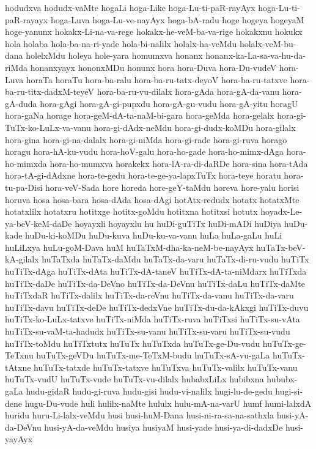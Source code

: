 {hodudxva
hodudx-vaMte
hogaLi
hoga-Like
hoga-Lu-ti-paR-rayAyx
hoga-Lu-ti-paR-rayayx
hoga-Luva
hoga-Lu-ve-nayAyx
hoga-bA-radu
hoge
hogeya
hogeyaM
hoge-yanunx
hokakx-Li-na-va-rege
hokakx-he-veM-ba-va-rige
hokakxnu
hokukx
hola
holaba
hola-ba-na-ri-yade
hola-bi-nalilx
holalx-ha-veMdu
holalx-veM-bu-dana
holelxMdu
holeya
hole-yara
homumxva
honanx
honanx-ka-La-sa-va-hu-da-riMda
honanxyayx
hononxMDu
honunx
hora
hora-Duva
hora-Du-vudeV
hora-Luva
horaTa
horaTu
hora-ba-ralu
hora-ba-ru-tatx-deyoV
hora-ba-ru-tatxve
hora-ba-ru-titx-dadxM-teyeV
hora-ba-ru-vu-dilalx
hora-gAda
hora-gA-da-vanu
hora-gA-duda
hora-gAgi
hora-gA-gi-pupxdu
hora-gA-gu-vudu
hora-gA-yitu
horagU
hora-gaNa
horage
hora-geM-dA-ta-naM-bi-gara
hora-geMda
hora-gelalx
hora-gi-TuTx-ko-LuLx-va-vanu
hora-gi-dAdx-neMdu
hora-gi-dudx-koMDu
hora-gilalx
hora-gina
hora-gi-na-dalalx
hora-gi-niMda
hora-gi-rade
hora-gi-ruva
horago
horagu
hora-hA-ku-vudu
hora-hoV-galu
hora-ho-gade
hora-ho-mimx-dAga
hora-ho-mimxda
hora-ho-mumxva
horakekx
hora-lA-ra-di-daRDe
hora-sina
hora-tAda
hora-tA-gi-dAdxne
hora-te-gedu
hora-te-ge-ya-lapxTuTx
hora-teye
horatu
hora-tu-pa-Disi
hora-veV-Sada
hore
horeda
hore-geY-taMdu
horeva
hore-yalu
horisi
horuva
hosa
hosa-bara
hosa-dAda
hosa-dAgi
hotAtx-redudx
hotatx
hotatxMte
hotatxlilx
hotatxru
hotitxge
hotitx-goMdu
hotitxna
hotitxsi
hotutx
hoyadx-Le-ya-beV-keM-daDe
hoyayxli
hoyayxlu
hu
huDi-guTiTx
huDi-mADi
huDiya
huDu-kade
huDu-ki-koMDu
huDu-kuva
huDu-ku-va-vanu
huLa
huLa-gaLu
huLi
huLiLxya
huLu-goM-Dava
huM
huTaTxM-dha-ka-neM-be-nayAyx
huTaTx-beV-kA-gilalx
huTaTxda
huTaTx-daMdu
huTaTx-da-varu
huTaTx-di-ru-vudu
huTiTx
huTiTx-dAga
huTiTx-dAta
huTiTx-dA-taneV
huTiTx-dA-ta-niMdarx
huTiTxda
huTiTx-daDe
huTiTx-da-DeVno
huTiTx-da-DeVnu
huTiTx-daLu
huTiTx-daMte
huTiTxdaR
huTiTx-dalilx
huTiTx-da-reVnu
huTiTx-da-vanu
huTiTx-da-varu
huTiTx-davu
huTiTx-deDe
huTiTx-dedxVne
huTiTx-du-da-kAkxgi
huTiTx-duvu
huTiTx-ko-LuLx-tatxve
huTiTx-niMda
huTiTx-ruva
huTiTxsi
huTiTx-su-vAta
huTiTx-su-vaM-ta-hadudx
huTiTx-su-vanu
huTiTx-su-varu
huTiTx-su-vudu
huTiTx-toMdu
huTiTxtutx
huTuTx
huTuTxda
huTuTx-ge-Du-vudu
huTuTx-ge-TeTxnu
huTuTx-geVDu
huTuTx-me-TeTxM-budu
huTuTx-sA-vu-gaLa
huTuTx-tAtxne
huTuTx-tatxde
huTuTx-tatxve
huTuTxva
huTuTx-valilx
huTuTx-vanu
huTuTx-vudU
huTuTx-vude
huTuTx-vu-dilalx
hubabxLiLx
hubibxna
hububx-gaLa
hudu-gidaR
hudu-gi-ruva
hudu-gisi
hudu-vi-nalilx
hugi-lu-de-gedu
hugi-si-dene
hugu-Du-vude
huli
hulilx-naMte
hululx
hulu-mA-na-varU
humf
humi-lalxdA
huridu
huru-Li-lalx-veMdu
husi
husi-huM-Dana
husi-ni-ra-sa-na-sathxla
husi-yA-da-DeVnu
husi-yA-da-veMdu
husiya
husiyaM
husi-yade
husi-ya-di-dadxDe
husi-yayAyx
}
